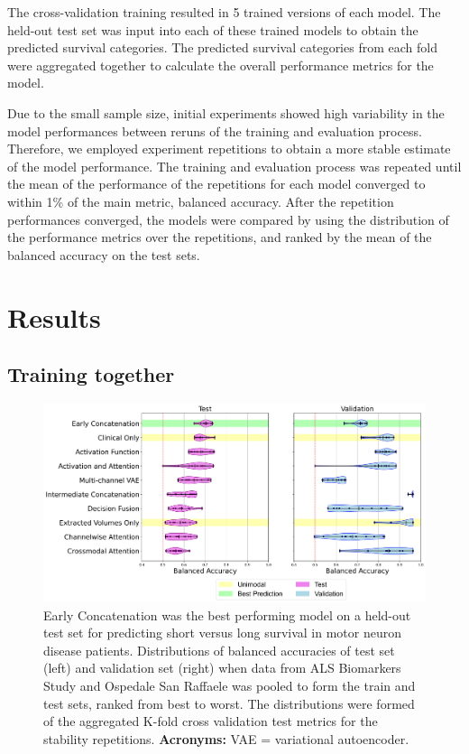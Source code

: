 The cross-validation training resulted in 5 trained versions of each model.
The held-out test set was input into each of these trained models to obtain the predicted survival categories.
The predicted survival categories from each fold were aggregated together to calculate the overall performance metrics for the model.


Due to the small sample size, initial experiments showed high variability in the model performances between reruns of the training and evaluation process.
Therefore, we employed experiment repetitions to obtain a more stable estimate of the model performance.
The training and evaluation process was repeated until the mean of the performance of the repetitions for each model converged to within 1\% of the main metric, balanced accuracy.
After the repetition performances converged, the models were compared by using the distribution of the performance metrics over the repetitions, and ranked by the mean of the balanced accuracy on the test sets.


\section{Results}
\subsection{Training together}

\begin{figure}
    \centering
    \hspace*{-2cm}
    \includegraphics[width=1.2\linewidth]{figures/both_sites_together_balanced_accuracy_violin}
    \caption[Distributions of balanced accuracies of test sets and validation sets on predicting short versus long survival in motor neuron disease patients from both datasets: ALS Biomarkers Study and Ospedale San Raffaele.]{Early Concatenation was the best performing model on a held-out test set for predicting short versus long survival in motor neuron disease patients. Distributions of balanced accuracies of test set (left) and validation set (right) when data from ALS Biomarkers Study and Ospedale San Raffaele was pooled to form the train and test sets, ranked from best to worst. The distributions were formed of the aggregated K-fold cross validation test metrics for the stability repetitions. \textbf{Acronyms:} VAE = variational autoencoder.}
    \label{fig:trainedtogetherviolin}
\end{figure}

